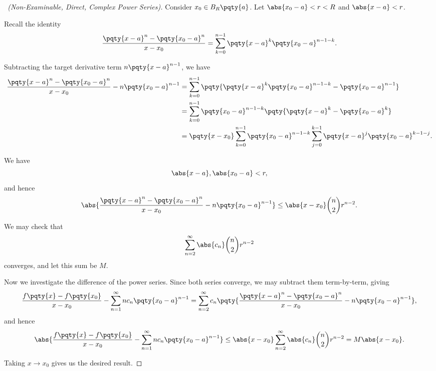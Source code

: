 \begin{proof}[\proofname\ (Non-Examinable, Direct, Complex Power Series)]
    Consider \(x_0 \in B_R\pqty{a}\). Let \(\abs{x_0 - a} < r < R\) and \(\abs{x - a} < r\).

    Recall the identity
    \[
        \frac{\pqty{x - a}^n - \pqty{x_0 - a}^n}{x - x_0} = \sum_{k = 0}^{n - 1} \pqty{x - a}^k \pqty{x_0 - a}^{n - 1 - k}.
    \]

    Subtracting the target derivative term \(n \pqty{x - a}^{n - 1}\), we have
    \begin{align*}
        \frac{\pqty{x - a}^n - \pqty{x_0 - a}^n}{x - x_0} - n \pqty{x_0 - a}^{n - 1} &= \sum_{k = 0}^{n - 1} \pqty{\pqty{x - a}^k \pqty{x_0 - a}^{n - 1 - k} - \pqty{x_0 - a}^{n - 1}} \\
        &= \sum_{k = 0}^{n - 1} \pqty{x_0 - a}^{n - 1 - k} \pqty{\pqty{x - a}^k - \pqty{x_0 - a}^k} \\
        &= \pqty{x - x_0} \sum_{k = 0}^{n - 1} \pqty{x_0 - a}^{n - 1 - k} \sum_{j = 0}^{k - 1} \pqty{x - a}^{j} \pqty{x_0 - a}^{k - 1 - j}.
    \end{align*}

    We have
    \[
        \abs{x - a}, \abs{x_0 - a} < r,
    \]
    and hence
    \[
        \abs{\frac{\pqty{x - a}^n - \pqty{x_0 - a}^n}{x - x_0} - n \pqty{x_0 - a}^{n - 1}} \leq \abs{x - x_0} \binom{n}{2} r^{n - 2}.
    \]

    We may check that
    \[
        \sum_{n = 2}^{\infty} \abs{c_n} \binom{n}{2} r^{n - 2}
    \]
    converges, and let this sum be \(M\).
    
    Now we investigate the difference of the power series. Since both series converge, we may subtract them term-by-term, giving
    \[
        \frac{f\pqty{x} - f\pqty{x_0}}{x - x_0} - \sum_{n = 1}^{\infty} n c_n \pqty{x_0 - a}^{n - 1} = \sum_{n = 2}^{\infty} c_n \pqty{\frac{\pqty{x - a}^n - \pqty{x_0 - a}^n}{x - x_0} - n \pqty{x_0 - a}^{n - 1}},
    \]
    and hence
    \[
        \abs{\frac{f\pqty{x} - f\pqty{x_0}}{x - x_0} - \sum_{n = 1}^{\infty} n c_n \pqty{x_0 - a}^{n - 1}} \leq \abs{x - x_0} \sum_{n = 2}^{\infty} \abs{c_n} \binom{n}{2} r^{n - 2} = M \abs{x - x_0}.
    \]

    Taking \(x \to x_0\) gives us the desired result.
\end{proof}

